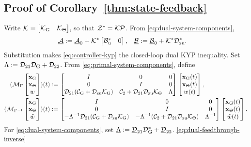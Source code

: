 
\subsection{Proof of Corollary~\ref{thm:state-feedback}}\label{proof:state-feedback}
\begingroup
\setlength{\abovedisplayskip}{4pt plus 1pt minus 1pt}
\setlength{\belowdisplayskip}{4pt plus 1pt minus 1pt}
\setlength{\abovedisplayshortskip}{2pt plus 1pt}
\setlength{\belowdisplayshortskip}{4pt plus 1pt minus 1pt}
Write $\mathcal{K}=\begin{bmatrix}\mathcal{K}_{{\mathrm{G}}}&\mathcal{K}_\Theta\end{bmatrix}$, so that
$\mathcal{Z}^*=\mathcal{K}\mathcal{P}$. From \eqref{eq:dual-system-components},
\begin{equation*}
\begin{aligned}
\underline{\mathcal{A}}
&:=
\underline{\mathcal{A}}_0
+
\mathcal{K}^*
\begin{bmatrix}\mathcal{B}_{{\mathrm{u}}}^*&0\end{bmatrix},
&
\underline{\mathcal{B}}
&:=
\underline{\mathcal{B}}_0
+
\mathcal{K}^*
\mathcal{D}_{{\mathrm{zu}}}^* .
\end{aligned}
\end{equation*}
Substitution makes \eqref{eq:controller-kyp} the closed-loop dual KYP
inequality. Set
$\Lambda:=\mathcal{D}_{21}\mathcal{D}_{{\mathrm{G}}}+\mathcal{D}_{22}$.
From \eqref{eq:primal-system-components}, define
\begin{equation*}
\begin{aligned}
(\mathcal{M}_\Gamma\begin{bmatrix}\mathbf{x}_{{\mathrm{G}}}\\\mathbf{x}_\Theta\\w\end{bmatrix})(t)
&:=\begin{bmatrix}
I&0&0\\
0&I&0\\
\mathcal{D}_{21}(\mathcal{C}_{{\mathrm{G}}}+\mathcal{D}_{{\mathrm{zu}}}\mathcal{K}_{{\mathrm{G}}})
&\mathcal{C}_2+\mathcal{D}_{21}\mathcal{D}_{{\mathrm{zu}}}\mathcal{K}_\Theta&\Lambda
\end{bmatrix}\begin{bmatrix}\mathbf{x}_{{\mathrm{G}}}(t)\\\mathbf{x}_\Theta(t)\\w(t)\end{bmatrix},\\
(\mathcal{M}_{\Gamma^{-1}}\begin{bmatrix}\mathbf{x}_{{\mathrm{G}}}\\\mathbf{x}_\Theta\\\tilde w\end{bmatrix})(t)
&:=\begin{bmatrix}
I&0&0\\
0&I&0\\
-\Lambda^{-1}\mathcal{D}_{21}(\mathcal{C}_{{\mathrm{G}}}+\mathcal{D}_{{\mathrm{zu}}}\mathcal{K}_{{\mathrm{G}}})
&-\Lambda^{-1}(\mathcal{C}_2+\mathcal{D}_{21}\mathcal{D}_{{\mathrm{zu}}}\mathcal{K}_\Theta)
&\Lambda^{-1}
\end{bmatrix}\begin{bmatrix}\mathbf{x}_{{\mathrm{G}}}(t)\\\mathbf{x}_\Theta(t)\\\tilde w(t)\end{bmatrix}.
\end{aligned}
\end{equation*}
For \eqref{eq:dual-system-components}, set
$\underline\Lambda:=\underline{\mathcal{D}}_{21}\mathcal{D}_{{\mathrm{G}}}^*
+\underline{\mathcal{D}}_{22}$. \eqref{eq:dual-feedthrough-inverse}

